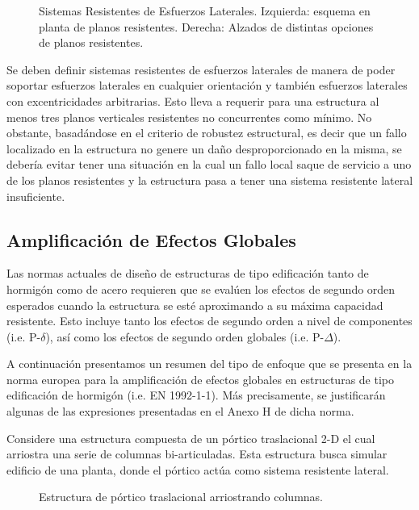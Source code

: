 \begin{figure}[htb]
  \centering
	\caption{Sistemas Resistentes de Esfuerzos Laterales. Izquierda: esquema en planta de planos resistentes. Derecha: Alzados de distintas opciones de planos resistentes.}
	\label{fig:EsqNucleos}
\end{figure}

Se deben definir sistemas resistentes de esfuerzos laterales de manera de poder soportar esfuerzos laterales en cualquier orientación y también esfuerzos laterales con excentricidades arbitrarias. Esto lleva a requerir para una estructura al menos tres planos verticales resistentes no concurrentes como mínimo. No obstante, basadándose en el criterio de robustez estructural, es decir que un fallo localizado en la estructura no genere un daño desproporcionado en la misma, se debería evitar tener una situación en la cual un fallo local saque de servicio a uno de los planos resistentes y la estructura pasa a tener una sistema resistente lateral insuficiente.


\subsection{Amplificación de Efectos Globales}

Las normas actuales de diseño de estructuras de tipo edificación tanto de hormigón como de acero requieren que se evalúen los efectos de segundo orden esperados cuando la estructura se esté aproximando a su máxima capacidad resistente. Esto incluye tanto los efectos de segundo orden a nivel de componentes (i.e. P-$\delta$), así como los efectos de segundo orden globales (i.e. P-$\Delta$).

A continuación presentamos un resumen del tipo de enfoque que se presenta en la norma europea para la amplificación de efectos globales en estructuras de tipo edificación de hormigón (i.e. EN 1992-1-1). Más precisamente, se justificarán algunas de las expresiones presentadas en el Anexo H de dicha norma.

Considere una estructura compuesta de un pórtico traslacional 2-D el cual arriostra una serie de columnas bi-articuladas. Esta estructura busca simular edificio de una planta, donde el pórtico actúa como sistema resistente lateral.

\begin{figure}[htb]
  \centering
  \def\svgwidth{0.8\textwidth}
  
	\caption{Estructura de pórtico traslacional arriostrando columnas.}
	\label{fig:globales}
\end{figure}

